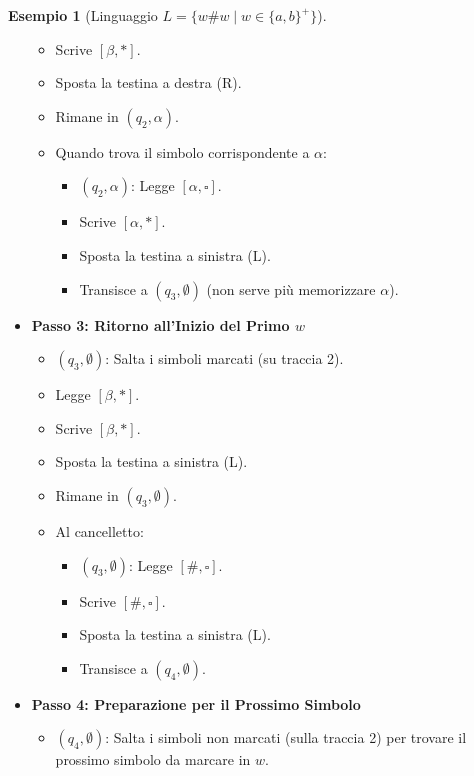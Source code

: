 \documentclass[a4paper]{article}
\theoremstyle{definition} %
\newtheorem{example}{Esempio}
\newcommand{\blankS}{\ensuremath{\square}}
\begin{document}
\begin{example}[Linguaggio $L = \{w\#w \mid w \in \{a,b\}^+\}$]
\begin{itemize}
\begin{itemize}
            \item Scrive $[\beta, *]$.
            \item Sposta la testina a destra (R).
            \item Rimane in $(q_2, \alpha)$.
            \item Quando trova il simbolo corrispondente a $\alpha$:
                \begin{itemize}
                    \item $(q_2, \alpha)$: Legge $[\alpha, \blankS]$.
                    \item Scrive $[\alpha, *]$.
                    \item Sposta la testina a sinistra (L).
                    \item Transisce a $(q_3, \emptyset)$ (non serve più memorizzare $\alpha$).
                \end{itemize}
        \end{itemize}
    \item \textbf{Passo 3: Ritorno all'Inizio del Primo $w$}
        \begin{itemize}
            \item $(q_3, \emptyset)$: Salta i simboli marcati (su traccia 2).
            \item Legge $[\beta, *]$.
            \item Scrive $[\beta, *]$.
            \item Sposta la testina a sinistra (L).
            \item Rimane in $(q_3, \emptyset)$.
            \item Al cancelletto:
                \begin{itemize}
                    \item $(q_3, \emptyset)$: Legge $[\#, \blankS]$.
                    \item Scrive $[\#, \blankS]$.
                    \item Sposta la testina a sinistra (L).
                    \item Transisce a $(q_4, \emptyset)$.
                \end{itemize}
        \end{itemize}
    \item \textbf{Passo 4: Preparazione per il Prossimo Simbolo}
        \begin{itemize}
            \item $(q_4, \emptyset)$: Salta i simboli non marcati (sulla traccia 2) per trovare il prossimo simbolo da marcare in $w$.

\end{itemize}
\end{itemize}
\end{example}
\end{document}
